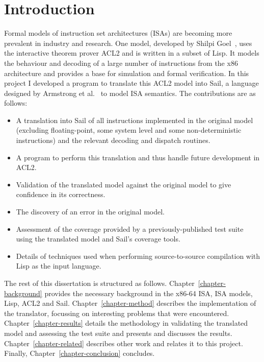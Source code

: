 \documentclass[a4paper,12pt,twoside,openright]{report}
\begin{document}
\pagestyle{empty}
\singlespacing


\setcounter{page}{0}
\pagestyle{plain}
\tableofcontents
\listoffigures

\onehalfspacing


\chapter{Introduction}
\setcounter{page}{1} 

Formal models of instruction set architectures (ISAs) are becoming more prevalent in industry and research.  One model, developed by Shilpi Goel~\cite{goel-thesis}, uses the interactive theorem prover ACL2 and is written in a subset of Lisp.  It models the behaviour and decoding of a large number of instructions from the x86 architecture and provides a base for simulation and formal verification.  In this project I developed a program to translate this ACL2 model into Sail, a language designed by Armstrong et al.~\cite{sail-paper} to model ISA semantics.  The contributions are as follows:

\begin{itemize}
	\item A translation into Sail of all instructions implemented in the original model (excluding floating-point, some system level and some non-deterministic instructions) and the relevant decoding and dispatch routines.
	\item A program to perform this translation and thus handle future development in ACL2.
	\item Validation of the translated model against the original model to give confidence in its correctness.
	\item The discovery of an error in the original model.
  \item Assessment of the coverage provided by a previously-published test suite using the translated model and Sail's coverage tools.
  \item Details of techniques used when performing source-to-source compilation with Lisp as the input language.
\end{itemize}

The rest of this dissertation is structured as follows.  Chapter~\ref{chapter-background} provides the necessary background in the x86-64 ISA, ISA models, Lisp, ACL2 and Sail.  Chapter~\ref{chapter-method} describes the implementation of the translator, focussing on interesting problems that were encountered.  Chapter~\ref{chapter-results} details the methodology in validating the translated model and assessing the test suite and presents and discusses the results.  Chapter~\ref{chapter-related} describes other work and relates it to this project.  Finally, Chapter~\ref{chapter-conclusion} concludes.
\end{document}
